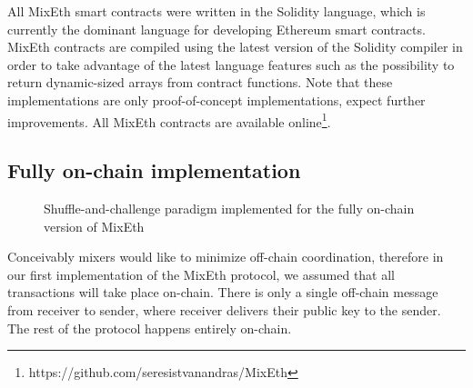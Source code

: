 \documentclass[a4paper]{article}
\theoremstyle{definition}
\begin{document}
All MixEth smart contracts were written in the Solidity language, which is currently the dominant language for developing Ethereum smart contracts. MixEth contracts are compiled using the latest version of the Solidity compiler in order to take advantage of the latest language features such as the possibility to return dynamic-sized arrays from contract functions. Note that these implementations are only proof-of-concept implementations, expect further improvements. All MixEth contracts are available online\footnote{https://github.com/seresistvanandras/MixEth}.  

\subsection{Fully on-chain implementation} \label{fullyonchainimpl}

\begin{figure}
	\centering
{}
\captionsetup{justification=centering}
\caption{Shuffle-and-challenge paradigm implemented for the fully on-chain version of MixEth}
\label{fig:shuffleandchallenge}
\end{figure}

Conceivably mixers would like to minimize off-chain coordination, therefore in our first implementation of the MixEth protocol, we assumed that all transactions will take place on-chain. There is only a single off-chain message from receiver to sender, where receiver delivers their public key to the sender. The rest of the protocol happens entirely on-chain.
\end{document}
